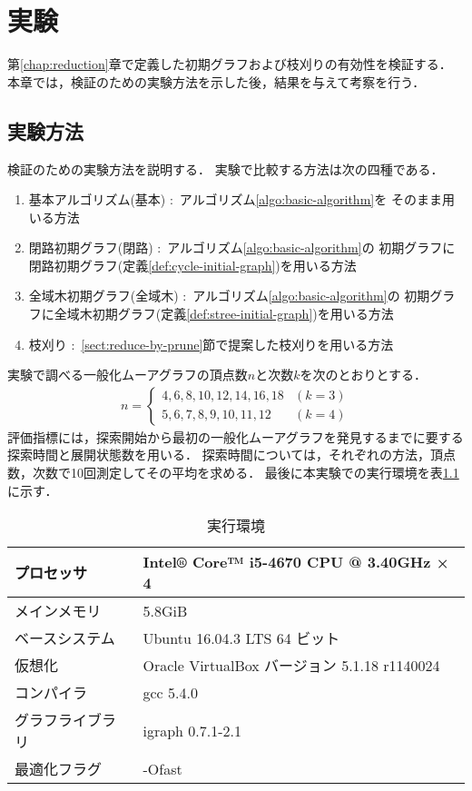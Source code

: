 
\chapter{実験}
\label{sect:experiment}
第\ref{chap:reduction}章で定義した初期グラフおよび枝刈りの有効性を検証する．
本章では，検証のための実験方法を示した後，結果を与えて考察を行う．

\section{実験方法}
検証のための実験方法を説明する．
実験で比較する方法は次の四種である．
\begin{enumerate}
\item 基本アルゴリズム(基本) :\ アルゴリズム\ref{algo:basic-algorithm}を
  そのまま用いる方法
\item 閉路初期グラフ(閉路) :\ アルゴリズム\ref{algo:basic-algorithm}の
  初期グラフに閉路初期グラフ(定義\ref{def:cycle-initial-graph})を用いる方法
\item 全域木初期グラフ(全域木) :\ アルゴリズム\ref{algo:basic-algorithm}の
  初期グラフに全域木初期グラフ(定義\ref{def:stree-initial-graph})を用いる方法
\item 枝刈り :\ \ref{sect:reduce-by-prune}節で提案した枝刈りを用いる方法
\end{enumerate}
実験で調べる一般化ムーアグラフの頂点数$n$と次数$k$を次のとおりとする．
\begin{equation*}
  \begin{aligned}
    n=\begin{cases}
      4,6,8,10,12,14,16,18 & (k=3) \\
      5,6,7,8,9,10,11,12 & (k=4)
    \end{cases}
  \end{aligned}
\end{equation*}
評価指標には，探索開始から最初の一般化ムーアグラフを発見するまでに要する
探索時間と展開状態数を用いる．
探索時間については，それぞれの方法，頂点数，次数で10回測定してその平均を求める．
最後に本実験での実行環境を表\ref{tab:env-lab}に示す．
\begin{table}
  \caption{実行環境}
  \label{tab:env-lab}
  \centering
  \begin{tabular}{ll}
    \hline
    プロセッサ & Intel® Core™ i5-4670 CPU @ 3.40GHz × 4 \\ \hline
    メインメモリ & 5.8GiB \\ \hline
    ベースシステム & Ubuntu 16.04.3 LTS 64 ビット \\ \hline
    仮想化 & Oracle VirtualBox バージョン 5.1.18 r1140024 \\ \hline
    コンパイラ & gcc 5.4.0 \\ \hline
    グラフライブラリ & igraph 0.7.1-2.1 \\ \hline
    最適化フラグ & -Ofast \\ \hline
  \end{tabular}
\end{table}

